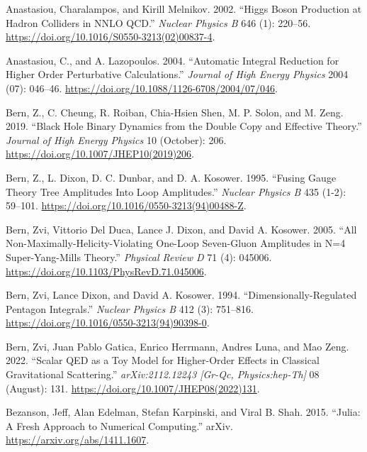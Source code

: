 \documentclass[
  11pt,
  a4paper,
  DIV=11,
  numbers=noendperiod,
  oneside]{scrreprt}
\newlength{\cslhangindent}
\newlength{\cslentryspacingunit} %
\newenvironment{CSLReferences}[2] %
 {%
  \setlength{\parindent}{0pt}
  \ifodd #1
  \let\oldpar\par
  \def\par{\hangindent=\cslhangindent\oldpar}
  \fi
  \setlength{\parskip}{#2\cslentryspacingunit}
 }%
 {}
\DeclareRobustCommand{\[}{\begin{equation}}
\DeclareRobustCommand{\]}{\end{equation}}
\begin{document}
\begin{CSLReferences}{1}{0}
\leavevmode{}%
Anastasiou, Charalampos, and Kirill Melnikov. 2002. {``Higgs Boson
Production at Hadron Colliders in {NNLO QCD}.''} \emph{Nuclear Physics
B} 646 (1): 220--56.
\url{https://doi.org/10.1016/S0550-3213(02)00837-4}.

\leavevmode{}%
Anastasiou, C., and A. Lazopoulos. 2004. {``Automatic {Integral
Reduction} for {Higher Order Perturbative Calculations}.''}
\emph{Journal of High Energy Physics} 2004 (07): 046--46.
\url{https://doi.org/10.1088/1126-6708/2004/07/046}.

\leavevmode{}%
Bern, Z., C. Cheung, R. Roiban, Chia-Hsien Shen, M. P. Solon, and M.
Zeng. 2019. {``Black Hole Binary Dynamics from the Double Copy and
Effective Theory.''} \emph{Journal of High Energy Physics} 10 (October):
206. \url{https://doi.org/10.1007/JHEP10(2019)206}.

\leavevmode{}%
Bern, Z., L. Dixon, D. C. Dunbar, and D. A. Kosower. 1995. {``Fusing
{Gauge Theory Tree Amplitudes Into Loop Amplitudes}.''} \emph{Nuclear
Physics B} 435 (1-2): 59--101.
\url{https://doi.org/10.1016/0550-3213(94)00488-Z}.

\leavevmode{}%
Bern, Zvi, Vittorio Del Duca, Lance J. Dixon, and David A. Kosower.
2005. {``All {Non-Maximally-Helicity-Violating One-Loop Seven-Gluon
Amplitudes} in {N}=4 {Super-Yang-Mills Theory}.''} \emph{Physical Review
D} 71 (4): 045006. \url{https://doi.org/10.1103/PhysRevD.71.045006}.

\leavevmode{}%
Bern, Zvi, Lance Dixon, and David A. Kosower. 1994.
{``Dimensionally-Regulated Pentagon Integrals.''} \emph{Nuclear Physics
B} 412 (3): 751--816.
\url{https://doi.org/10.1016/0550-3213(94)90398-0}.

\leavevmode{}%
Bern, Zvi, Juan Pablo Gatica, Enrico Herrmann, Andres Luna, and Mao
Zeng. 2022. {``Scalar {QED} as a Toy Model for Higher-Order Effects in
Classical Gravitational Scattering.''} \emph{arXiv:2112.12243 {[}Gr-Qc,
Physics:hep-Th{]}} 08 (August): 131.
\url{https://doi.org/10.1007/JHEP08(2022)131}.

\leavevmode{}%
Bezanson, Jeff, Alan Edelman, Stefan Karpinski, and Viral B. Shah. 2015.
{``Julia: {A Fresh Approach} to {Numerical Computing}.''} {arXiv}.
\url{https://arxiv.org/abs/1411.1607}.


\end{CSLReferences}
\end{document}
